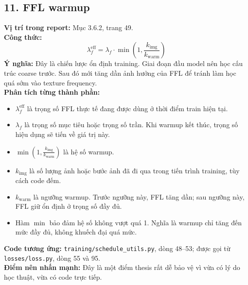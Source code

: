 \documentclass[12pt,a4paper]{article}
\begin{document}
\subsection*{11. FFL warmup}
\textbf{Vị trí trong report:} Mục 3.6.2, trang 49.\\
\textbf{Công thức:}
\[
\lambda_f^{\mathrm{eff}} =
\lambda_f \cdot \min\left(1,\frac{k_{\mathrm{img}}}{k_{\mathrm{warm}}}\right)
\]
\textbf{Ý nghĩa:} Đây là chiến lược ổn định training. Giai đoạn đầu model nên học cấu trúc coarse trước. Sau đó mới tăng dần ảnh hưởng của FFL để tránh làm học quá sớm vào texture frequency.\\
\textbf{Phân tích từng thành phần:}
\begin{itemize}[leftmargin=1.5em]
\item $\lambda_f^{\mathrm{eff}}$ là trọng số FFL thực tế đang được dùng ở thời điểm train hiện tại.
\item $\lambda_f$ là trọng số mục tiêu hoặc trọng số trần. Khi warmup kết thúc, trọng số hiệu dụng sẽ tiến về giá trị này.
\item $\min\left(1,\frac{k_{\mathrm{img}}}{k_{\mathrm{warm}}}\right)$ là hệ số warmup.
\item $k_{\mathrm{img}}$ là số lượng ảnh hoặc bước ảnh đã đi qua trong tiến trình training, tùy cách code đếm.
\item $k_{\mathrm{warm}}$ là ngưỡng warmup. Trước ngưỡng này, FFL tăng dần; sau ngưỡng này, FFL giữ ổn định ở trọng số đầy đủ.
\item Hàm $\min$ bảo đảm hệ số không vượt quá 1. Nghĩa là warmup chỉ tăng đến mức đầy đủ, không khuếch đại quá mức.
\end{itemize}
\textbf{Code tương ứng:} \texttt{training/schedule\_utils.py}, dòng 48--53; được gọi từ \texttt{losses/loss.py}, dòng 55 và 95.\\
\textbf{Điểm nên nhấn mạnh:} Đây là một điểm thesis rất dễ bảo vệ vì vừa có lý do học thuật, vừa có code trực tiếp.
\end{document}
